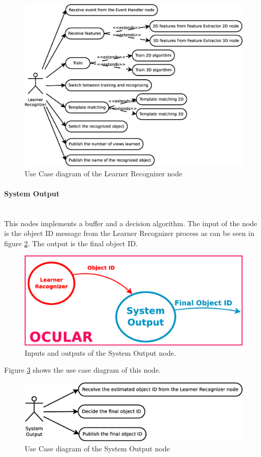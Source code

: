 	\begin{figure}[H]
		\centering
			\includegraphics[scale=0.4]{img/diagrams/uc_learner_recognizer.eps}
			\caption[Use case diagram Learner Recognizer node]{Use Case diagram of the Learner Recognizer node}
			\label{uc_learner_recognizer}
	\end{figure}



\paragraph{System Output}\mbox{}\\
	This nodes implements a buffer and a decision algorithm. 
	The input of the node is the object ID message from the Learner Recognizer process as can be seen in figure \ref{node_output}.
	The output is the final object ID. 


		\begin{figure}[H]
			\begin{center}
			\includegraphics[width=0.5\linewidth]{img/diagrams/node_output.eps}
			\caption[System Output node I/O]{Inputs and outputs of the System Output node.}		
			\label{node_output}
			\end{center}
		\end{figure}


	Figure \ref{uc_output} shows the use case diagram of this node. 

	\begin{figure}[H]
		\centering
			\includegraphics[scale=0.4]{img/diagrams/uc_system_output.eps}
			\caption[Use case diagram System Output node]{Use Case diagram of the System Output node}
			\label{uc_output}
	\end{figure}